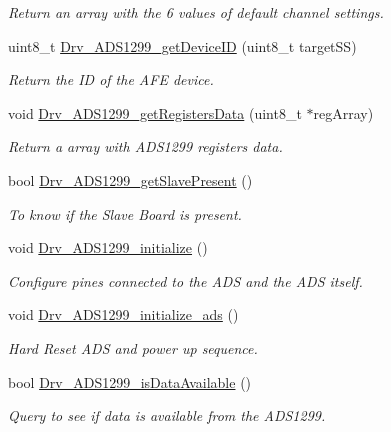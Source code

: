 \begin{DoxyCompactItemize}
\begin{DoxyCompactList}\small\item\em Return an array with the 6 values of default channel settings. \end{DoxyCompactList}\item 
uint8\+\_\+t \hyperlink{group__ADS1299__Library_ga812e36de1efba860dca4dec17b08b1a6}{Drv\+\_\+\+A\+D\+S1299\+\_\+get\+Device\+ID} (uint8\+\_\+t target\+SS)
\begin{DoxyCompactList}\small\item\em Return the ID of the A\+FE device. \end{DoxyCompactList}\item 
void \hyperlink{group__ADS1299__Library_ga790bde97963d9c00dc481bd2bbe91628}{Drv\+\_\+\+A\+D\+S1299\+\_\+get\+Registers\+Data} (uint8\+\_\+t $\ast$reg\+Array)
\begin{DoxyCompactList}\small\item\em Return a array with A\+D\+S1299 registers data. \end{DoxyCompactList}\item 
bool \hyperlink{group__ADS1299__Library_gae15b4a58c8244229e31efdc1c66a8672}{Drv\+\_\+\+A\+D\+S1299\+\_\+get\+Slave\+Present} ()
\begin{DoxyCompactList}\small\item\em To know if the Slave Board is present. \end{DoxyCompactList}\item 
void \hyperlink{group__ADS1299__Library_ga3a5f7edb0cb404ffa6865a56573a0c4b}{Drv\+\_\+\+A\+D\+S1299\+\_\+initialize} ()
\begin{DoxyCompactList}\small\item\em Configure pines connected to the A\+DS and the A\+DS itself. \end{DoxyCompactList}\item 
void \hyperlink{group__ADS1299__Library_ga7d4e3c16375e804d9275b55a5872410b}{Drv\+\_\+\+A\+D\+S1299\+\_\+initialize\+\_\+ads} ()
\begin{DoxyCompactList}\small\item\em Hard Reset A\+DS and power up sequence. \end{DoxyCompactList}\item 
bool \hyperlink{group__ADS1299__Library_ga55bafd8fc454bf91a40711e71c9028e0}{Drv\+\_\+\+A\+D\+S1299\+\_\+is\+Data\+Available} ()
\begin{DoxyCompactList}\small\item\em Query to see if data is available from the A\+D\+S1299. \end{DoxyCompactList}\item 

\end{DoxyCompactItemize}
